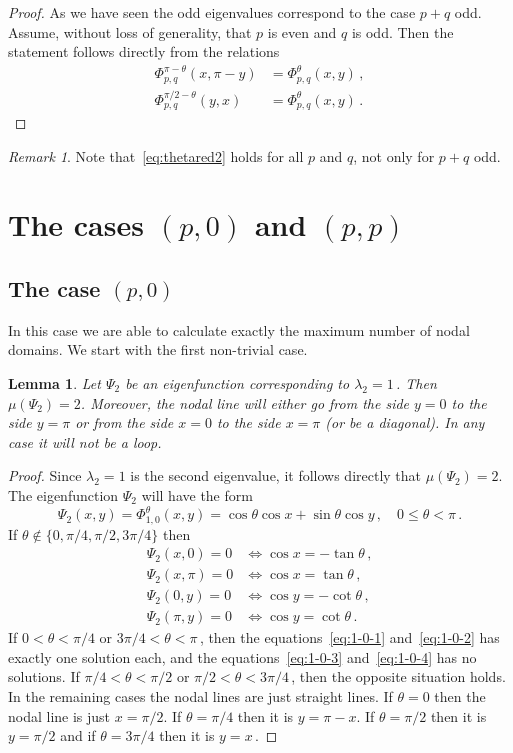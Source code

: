 \documentclass[a4paper,reqno,11pt]{amsart}
\newtheorem{lemma}[thm]{Lemma}
\theoremstyle{remark}
\newtheorem{remark}[thm]{Remark}
\theoremstyle{definition}
\numberwithin{equation}{section}
\begin{document}
\begin{proof}
As we have seen the odd eigenvalues correspond to the case $p+q$ odd. 
Assume, without loss of generality, that $p$ is even and $q$ is odd. Then 
the statement follows directly from the relations
\begin{align}
\label{eq:thetared1}\Phi_{p,q}^{\pi-\theta}(x,\pi-y) 
& = \Phi_{p,q}^{\theta}(x,y)\,,\\
\label{eq:thetared2}\Phi_{p,q}^{\pi/2-\theta}(y,x) 
& = \Phi_{p,q}^{\theta}(x,y)\,.
\end{align}
\end{proof}

\begin{remark}
Note that~\eqref{eq:thetared2} holds for all $p$ and $q$, not only for $p+q$ 
odd.
\end{remark}

\section{ The cases $(p,0)$ and $(p,p)$}\label{Section4}

\subsection{The case $(p,0)$}
In this case we are able to calculate exactly the maximum number of nodal
domains. We start with the first non-trivial case.

\begin{lemma}
\label{lem:10}
Let $\Psi_2$ be an eigenfunction corresponding to $\lambda_2=1\,$. 
Then $\mu(\Psi_2)=2$. Moreover, the nodal line will either go from the side 
$y=0$ to the side $y=\pi$ or from the side $x=0$ to the side $x=\pi$ 
(or be a diagonal). In any case it will not be a loop.
\end{lemma}

\begin{proof}
Since $\lambda_2=1$ is the second eigenvalue, it follows directly that 
$\mu(\Psi_2)=2$. The eigenfunction $\Psi_2$ will have the form
\[
\Psi_2(x,y)=\Phi_{1,0}^\theta(x,y)
=\cos\theta\cos x + \sin\theta\cos y\,,\quad 0\leq \theta<\pi\,.
\]
If $\theta\notin\{0,\pi/4,\pi/2,3\pi/4\}$ then
\begin{align}
\label{eq:1-0-1}
\Psi_2(x,0)=0 &\iff \cos x = -\tan\theta\,,\\
\label{eq:1-0-2}
\Psi_2(x,\pi)=0 & \iff \cos x=\tan\theta\,,\\
\label{eq:1-0-3}
\Psi_2(0,y)=0 &\iff \cos y = -\cot\theta\,,\\
\label{eq:1-0-4}
\Psi_2(\pi,y)=0 &\iff \cos y = \cot\theta\,.
\end{align}
If $0< \theta<\pi/4$ or $3\pi/4<\theta<\pi\,$, then the equations~\eqref{eq:1-0-1}
and~\eqref{eq:1-0-2} has exactly one solution each, and the 
equations~\eqref{eq:1-0-3} and~\eqref{eq:1-0-4} has no solutions. 
If $\pi/4<\theta<\pi/2$ or $\pi/2<\theta<3\pi/4\,$, then the opposite situation 
holds.
In the remaining cases the nodal lines are just straight lines. If $\theta=0$ 
then the nodal line is just $x=\pi/2$. If $\theta=\pi/4$ then it is $y=\pi-x$.
If $\theta=\pi/2$ then it is $y=\pi/2$ and if $\theta=3\pi/4$ then it is $y=x\,$.
\end{proof}
\end{document}
